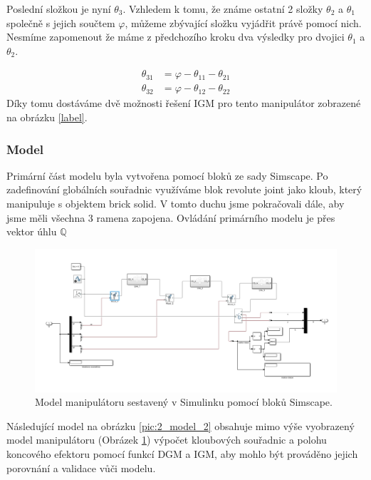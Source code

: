 \documentclass{article}
\begin{document}
				\noindent Poslední složkou je nyní \(\theta_3\). Vzhledem k tomu, že známe ostatní 2 složky \(\theta_2\) a \(\theta_1\) společně
				s jejich součtem \(\varphi\), můžeme zbývající složku vyjádřit právě pomocí nich. Nesmíme zapomenout že máme z předchozího kroku dva výsledky pro dvojici \(\theta_1\) a \(\theta_2\).
				
					\begin{align}
						\theta_{31} &= \varphi - \theta_{11} - \theta_{21} \label{eq:igm:theta_3_final}\\
						\theta_{32} &= \varphi - \theta_{12} - \theta_{22} 
					\end{align}
				\noindent Díky tomu dostáváme dvě možnosti řešení IGM pro tento manipulátor zobrazené na obrázku \ref{label}. 
			\subsubsection{Model}
			Primární část modelu byla vytvořena pomocí bloků ze sady Simscape. Po zadefinování globálních souřadnic využíváme blok revolute joint jako kloub, který manipuluje s objektem brick solid. V tomto duchu jsme pokračovali dále, aby jsme měli všechna 3 ramena zapojena. Ovládání primárního modelu je přes vektor úhlu \(\mathbb{Q}\)
				\begin{figure}[H]
					\centering
					\includegraphics[width=\textwidth]{./Graphics/2_Graphics/model.PNG}
					\caption{Model manipulátoru sestavený v Simulinku pomocí bloků Simscape.}
					\label{pic:2_simulink_model}
				\end{figure}
			Následující model na obrázku \ref{pic:2_model_2} obsahuje mimo výše vyobrazený model manipulátoru (Obrázek \ref{pic:2_simulink_model}) výpočet kloubových souřadnic a polohu koncového efektoru pomocí funkcí DGM a IGM, aby mohlo být prováděno jejich porovnání a validace vůči modelu. 
\end{document}
